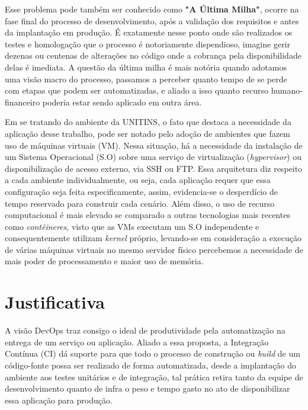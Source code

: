 Esse problema pode também ser conhecido como \textbf{"A Última Milha"}, ocorre na fase final do processo de desenvolvimento, após a validação dos requisitos e antes da implantação em produção. É exatamente nesse ponto onde são realizados os testes e homologação que o processo é notoriamente dispendioso, imagine gerir dezenas ou centenas de alterações no código onde a cobrança pela disponibilidade delas é imediata. A questão da última milha é mais notória quando adotamos uma visão macro do processo, passamos a perceber quanto tempo de se perde com etapas que podem ser automatizadas, e aliado a isso quanto recurso humano-financeiro poderia estar sendo aplicado em outra área. \cite{sato2014devops}

Em se tratando do ambiente da UNITINS, o fato que destaca a necessidade da aplicação desse trabalho, pode ser notado pelo adoção de ambientes que fazem uso de máquinas virtuais (VM). Nessa situação, há a necessidade da instalação de um Sistema Operacional (S.O) sobre uma serviço de virtualização (\textit{hypervisor}) ou disponibilização de acesso externo, via SSH ou FTP. Essa arquitetura diz respeito a cada ambiente individualmente, ou seja, cada aplicação requer que essa configuração seja feita especificamente, assim, evidencia-se o desperdício de tempo reservado para construir cada cenário. Além disso, o uso de recurso computacional é mais elevado se comparado a outras tecnologias mais recentes como \textit{contêineres}, visto que as VMs executam um S.O independente e consequentemente utilizam \textit{kernel} próprio, levando-se em consideração a execução de várias máquinas virtuais no mesmo servidor físico percebemos a necessidade de mais poder de processamento e maior uso de memória.\cite{laureano2006maquinas}


\section{Justificativa}\label{cap: justificativa}

A visão DevOps traz consigo o ideal de produtividade pela automatização na entrega de um serviço ou aplicação. Aliado a essa proposta, a Integração Contínua (CI) dá suporte para que todo o processo de construção ou \textit{build} de um código-fonte possa ser realizado de forma automatizada, desde a implantação do ambiente aos testes unitários e de integração, tal prática retira tanto da equipe de desenvolvimento quanto de infra o peso e tempo gasto no ato de disponibilizar essa aplicação para produção\cite{nathan2017}.

